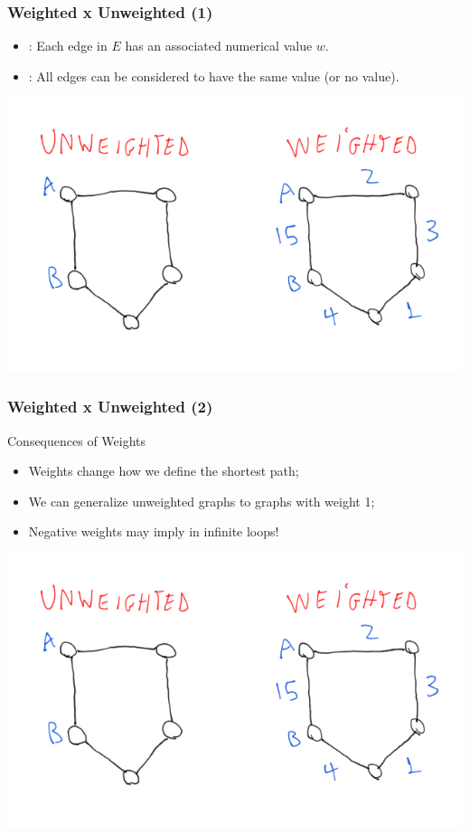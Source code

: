 \documentclass{beamer}
\begin{document}
\begin{frame}
  \frametitle{Weighted x Unweighted (1)}
  \begin{itemize}
    \item {}: Each edge in $E$ has an
      associated numerical value $w$.
    \item {}: All edges can be considered
      to have the same value (or no value).
  \end{itemize}
  \begin{center}
    \includegraphics[height=0.6\textheight]{img/weighted}
  \end{center}
\end{frame}

\begin{frame}
  \frametitle{Weighted x Unweighted (2)}
  \begin{block}{Consequences of Weights}
    {\small
    \begin{itemize}
    \item Weights change how we define the shortest path;
    \item We can generalize unweighted graphs to graphs with weight 1;
    \item Negative weights may imply in infinite loops!
    \end{itemize}}
  \end{block}
  \begin{center}
    \includegraphics[height=0.6\textheight]{img/weighted}
  \end{center}
\end{frame}
\end{document}
